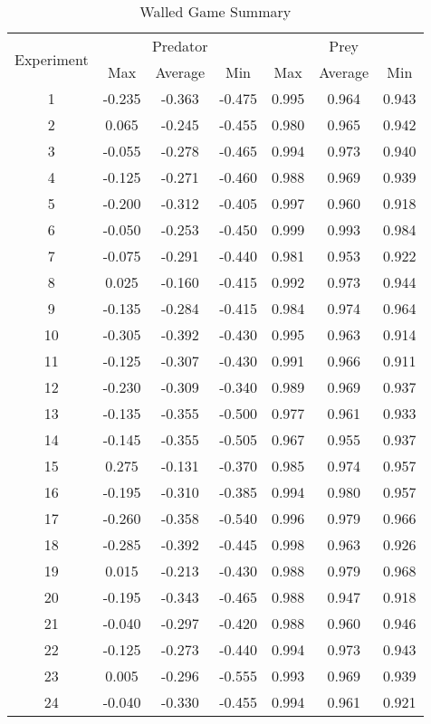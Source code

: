 \begin{table}
  \centering
  \begin{tabular}{|c|c|c|c|c|c|c|}
    \hline
    \multirow{2}{*}{Experiment} & \multicolumn{3}{|c|}{Predator} & \multicolumn{3}{|c|}{Prey} \\\cline{2-7}
    & Max & Average & Min & Max & Average & Min\\
    \hline
    1 & -0.235 & -0.363 & -0.475 & 0.995 & 0.964 & 0.943 \\
2 & 0.065 & -0.245 & -0.455 & 0.980 & 0.965 & 0.942 \\
3 & -0.055 & -0.278 & -0.465 & 0.994 & 0.973 & 0.940 \\
4 & -0.125 & -0.271 & -0.460 & 0.988 & 0.969 & 0.939 \\
5 & -0.200 & -0.312 & -0.405 & 0.997 & 0.960 & 0.918 \\
6 & -0.050 & -0.253 & -0.450 & 0.999 & 0.993 & 0.984 \\
7 & -0.075 & -0.291 & -0.440 & 0.981 & 0.953 & 0.922 \\
8 & 0.025 & -0.160 & -0.415 & 0.992 & 0.973 & 0.944 \\
9 & -0.135 & -0.284 & -0.415 & 0.984 & 0.974 & 0.964 \\
10 & -0.305 & -0.392 & -0.430 & 0.995 & 0.963 & 0.914 \\
11 & -0.125 & -0.307 & -0.430 & 0.991 & 0.966 & 0.911 \\
12 & -0.230 & -0.309 & -0.340 & 0.989 & 0.969 & 0.937 \\
13 & -0.135 & -0.355 & -0.500 & 0.977 & 0.961 & 0.933 \\
14 & -0.145 & -0.355 & -0.505 & 0.967 & 0.955 & 0.937 \\
15 & 0.275 & -0.131 & -0.370 & 0.985 & 0.974 & 0.957 \\
16 & -0.195 & -0.310 & -0.385 & 0.994 & 0.980 & 0.957 \\
17 & -0.260 & -0.358 & -0.540 & 0.996 & 0.979 & 0.966 \\
18 & -0.285 & -0.392 & -0.445 & 0.998 & 0.963 & 0.926 \\
19 & 0.015 & -0.213 & -0.430 & 0.988 & 0.979 & 0.968 \\
20 & -0.195 & -0.343 & -0.465 & 0.988 & 0.947 & 0.918 \\
21 & -0.040 & -0.297 & -0.420 & 0.988 & 0.960 & 0.946 \\
22 & -0.125 & -0.273 & -0.440 & 0.994 & 0.973 & 0.943 \\
23 & 0.005 & -0.296 & -0.555 & 0.993 & 0.969 & 0.939 \\
24 & -0.040 & -0.330 & -0.455 & 0.994 & 0.961 & 0.921 \\

    \hline
  \end{tabular}
  \caption{Walled Game Summary}
  \label{tab:walled-summary}
\end{table}


